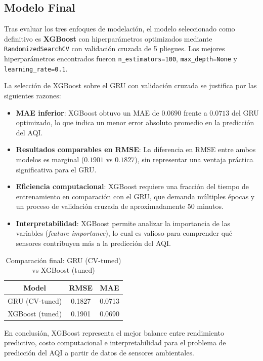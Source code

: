 \documentclass{article}
\begin{document}
\subsection{Modelo Final}
Tras evaluar los tres enfoques de modelación, el modelo seleccionado como definitivo es \textbf{XGBoost} con hiperparámetros optimizados mediante \texttt{RandomizedSearchCV} con validación cruzada de 5 pliegues. Los mejores hiperparámetros encontrados fueron \texttt{n\_estimators=100}, \texttt{max\_depth=None} y \texttt{learning\_rate=0.1}.

La selección de XGBoost sobre el GRU con validación cruzada se justifica por las siguientes razones:

\begin{itemize}
    \item \textbf{MAE inferior}: XGBoost obtuvo un MAE de $0.0690$ frente a $0.0713$ del GRU optimizado, lo que indica un menor error absoluto promedio en la predicción del AQI.
    \item \textbf{Resultados comparables en RMSE}: La diferencia en RMSE entre ambos modelos es marginal ($0.1901$ vs $0.1827$), sin representar una ventaja práctica significativa para el GRU.
    \item \textbf{Eficiencia computacional}: XGBoost requiere una fracción del tiempo de entrenamiento en comparación con el GRU, que demanda múltiples épocas y un proceso de validación cruzada de aproximadamente 50 minutos.
    \item \textbf{Interpretabilidad}: XGBoost permite analizar la importancia de las variables (\textit{feature importance}), lo cual es valioso para comprender qué sensores contribuyen más a la predicción del AQI.
\end{itemize}

\begin{table}[H]
\caption{Comparación final: GRU (CV-tuned) vs XGBoost (tuned)}
\centering
\begin{tabular}{c c c}
\hline\hline
    Model & RMSE & MAE \\ [0.5ex]
\hline
    GRU (CV-tuned)   & 0.1827 & 0.0713 \\
    XGBoost (tuned)  & 0.1901 & 0.0690 \\ [1ex]
\hline
\end{tabular}
\end{table}

En conclusión, XGBoost representa el mejor balance entre rendimiento predictivo, costo computacional e interpretabilidad para el problema de predicción del AQI a partir de datos de sensores ambientales.
\end{document}
